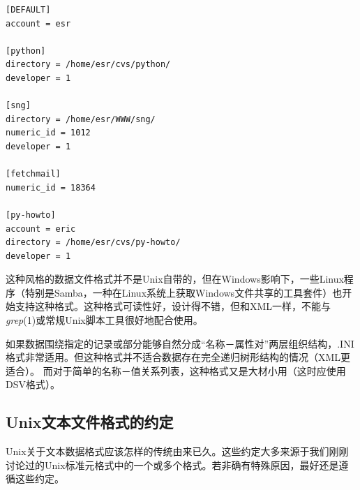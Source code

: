 \documentclass[12pt,oneside]{book}
\begin{document}
\begin{Verbatim}[label=例5.6 .INI文件实例]
[DEFAULT]
account = esr

[python]
directory = /home/esr/cvs/python/
developer = 1

[sng]
directory = /home/esr/WWW/sng/
numeric_id = 1012
developer = 1

[fetchmail]
numeric_id = 18364

[py-howto]
account = eric
directory = /home/esr/cvs/py-howto/
developer = 1
\end{Verbatim}

这种风格的数据文件格式并不是Unix自带的，但在Windows影响下，一些Linux程序（特别是Samba，一种在Linux系统上获取Windows文件共享的工具套件）也开始支持这种格式。这种格式可读性好，设计得不错，但和XML一样，不能与\textit{grep}(1)或常规Unix脚本工具很好地配合使用。

如果数据围绕指定的记录或部分能够自然分成“名称－属性对”两层组织结构，.INI格式非常适用。但这种格式并不适合数据存在完全递归树形结构的情况（XML更适合）。 而对于简单的名称－值关系列表，这种格式又是大材小用（这时应使用DSV格式）。

\subsection{Unix文本文件格式的约定}
Unix关于文本数据格式应该怎样的传统由来已久。这些约定大多来源于我们刚刚讨论过的Unix标准元格式中的一个或多个格式。若非确有特殊原因，最好还是遵循这些约定。
\end{document}

